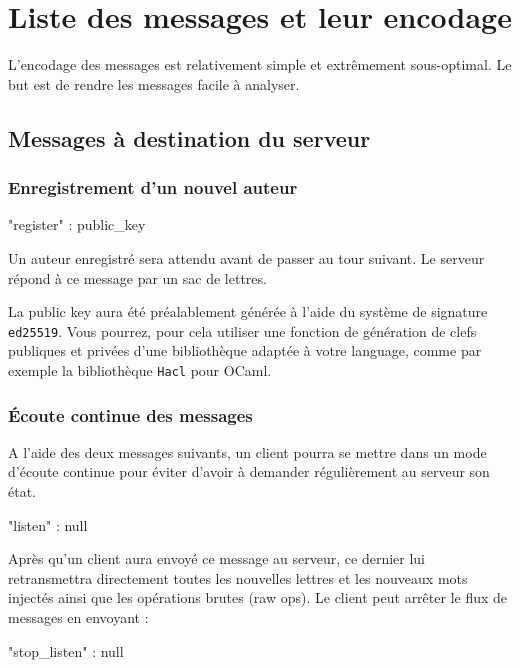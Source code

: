 \documentclass{article}
\begin{document}
\section{Liste des messages et leur encodage}
\label{sec:liste-des-messages}

L'encodage des messages est relativement simple et extrêmement
sous-optimal. Le but est de rendre les messages facile à analyser.

\subsection{Messages à destination du serveur}
\label{sec:mess-vers-serv}

\subsubsection{Enregistrement d'un nouvel auteur}
\label{sec:register}

\begin{jsonMessage}
  { "register" : public_key }
\end{jsonMessage}
Un auteur enregistré sera attendu avant de passer au tour suivant. Le
serveur répond à ce message par un sac de lettres.

La public key aura
été préalablement générée à l'aide du système de signature
\texttt{ed25519}. Vous pourrez, pour cela utiliser une fonction de
génération de clefs publiques et privées d'une bibliothèque adaptée à
votre language, comme par exemple la bibliothèque \texttt{Hacl} pour
OCaml.

\subsubsection{Écoute continue des messages}

A l'aide des deux messages suivants, un client pourra se mettre dans
un mode d'écoute continue pour éviter d'avoir à demander régulièrement
au serveur son état.

\label{sec:ecoute-continue}
\begin{jsonMessage}
  { "listen" : null }
\end{jsonMessage}
Après qu'un client aura envoyé ce message au serveur, ce dernier lui
retransmettra directement toutes les nouvelles lettres et les nouveaux
mots injectés ainsi que les opérations brutes (raw ops).  Le client
peut arrêter le flux de messages en envoyant :
\begin{jsonMessage}
  { "stop_listen" : null }
\end{jsonMessage}
\end{document}

